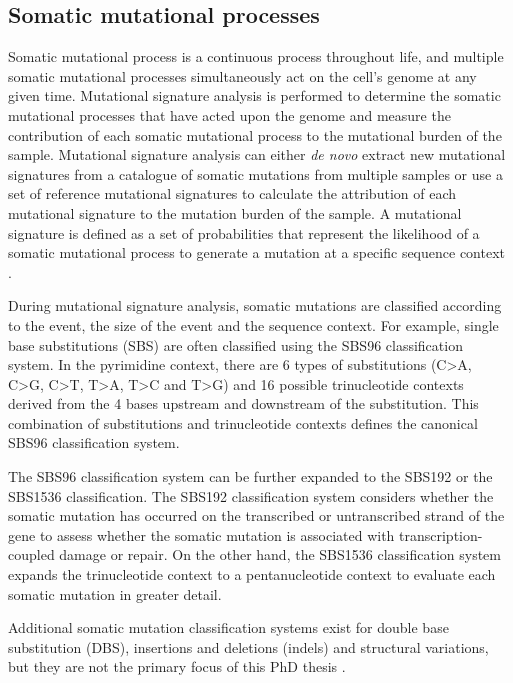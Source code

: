 \subsection{Somatic mutational processes}
\label{sec:mutational_signature_analysis}

Somatic mutational process is a continuous process throughout life, and multiple somatic mutational processes simultaneously act on the cell’s genome at any given time. Mutational signature analysis is performed to determine the somatic mutational processes that have acted upon the genome and measure the contribution of each somatic mutational process to the mutational burden of the sample. Mutational signature analysis can either \textit{de novo} extract new mutational signatures from a catalogue of somatic mutations from multiple samples or use a set of reference mutational signatures to calculate the attribution of each mutational signature to the mutation burden of the sample. A mutational signature is defined as a set of probabilities that represent the likelihood of a somatic mutational process to generate a mutation at a specific sequence context \cite{Alexandrov2013-fq}.

During mutational signature analysis, somatic mutations are classified according to the event, the size of the event and the sequence context. For example, single base substitutions (SBS) are often classified using the SBS96 classification system. In the pyrimidine context, there are 6 types of substitutions (C>A, C>G, C>T, T>A, T>C and T>G) and 16 possible trinucleotide contexts derived from the 4 bases upstream and downstream of the substitution. This combination of substitutions and trinucleotide contexts defines the canonical SBS96 classification system. 

The SBS96 classification system can be further expanded to the SBS192 or the SBS1536 classification. The SBS192 classification system considers whether the somatic mutation has occurred on the transcribed or untranscribed strand of the gene to assess whether the somatic mutation is associated with transcription-coupled damage or repair. On the other hand, the SBS1536 classification system expands the trinucleotide context to a pentanucleotide context to evaluate each somatic mutation in greater detail. 

Additional somatic mutation classification systems exist for double base substitution (DBS), insertions and deletions (indels) and structural variations, but they are not the primary focus of this PhD thesis \cite{Alexandrov2013-kg, Alexandrov2020-ys, Li2020-vw, Steele2022-mn}.

